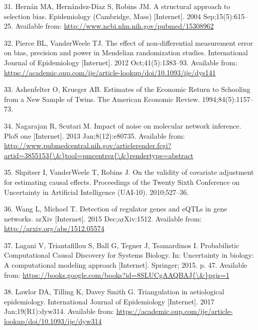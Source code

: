 \documentclass[]{article}
\begin{document}
\hypertarget{ref-Hernan2004}{}
31. Hernán MA, Hernández-Díaz S, Robins JM. A structural approach to
selection bias. Epidemiology (Cambridge, Mass) {[}Internet{]}. 2004
Sep;15(5):615--25. Available from:
\url{http://www.ncbi.nlm.nih.gov/pubmed/15308962}

\hypertarget{ref-Pierce2012}{}
32. Pierce BL, VanderWeele TJ. The effect of non-differential
measurement error on bias, precision and power in Mendelian
randomization studies. International Journal of Epidemiology
{[}Internet{]}. 2012 Oct;41(5):1383--93. Available from:
\url{https://academic.oup.com/ije/article-lookup/doi/10.1093/ije/dys141}

\hypertarget{ref-Ashenfelter1994}{}
33. Ashenfelter O, Krueger AB. Estimates of the Economic Return to
Schooling from a New Sample of Twins. The American Economic Review.
1994;84(5):1157--73.

\hypertarget{ref-Nagarajan2013}{}
34. Nagarajan R, Scutari M. Impact of noise on molecular network
inference. PloS one {[}Internet{]}. 2013 Jan;8(12):e80735. Available
from:
\href{http://www.pubmedcentral.nih.gov/articlerender.fcgi?artid=3855153\%7B/\&\%7Dtool=pmcentrez\%7B/\&\%7Drendertype=abstract}{http://www.pubmedcentral.nih.gov/articlerender.fcgi?artid=3855153\{\textbackslash{}\&\}tool=pmcentrez\{\textbackslash{}\&\}rendertype=abstract}

\hypertarget{ref-Shpitser2010}{}
35. Shpitser I, VanderWeele T, Robins J. On the validity of covariate
adjustment for estimating causal effects. Proceedings of the Twenty
Sixth Conference on Uncertainty in Artificial Intelligence (UAI-10).
2010;527--36.

\hypertarget{ref-Wang2015}{}
36. Wang L, Michoel T. Detection of regulator genes and eQTLs in gene
networks. arXiv {[}Internet{]}. 2015 Dec;arXiv:1512. Available from:
\url{http://arxiv.org/abs/1512.05574}

\hypertarget{ref-Lagani2015}{}
37. Lagani V, Triantafillou S, Ball G, Tegner J, Tsamardinos I.
Probabilistic Computational Causal Discovery for Systems Biology. In:
Uncertainty in biology: A computational modeling approach
{[}Internet{]}. Springer; 2015. p. 47. Available from:
\href{https://books.google.com/books?id=8SLUCgAAQBAJ\%7B/\&\%7Dpgis=1}{https://books.google.com/books?id=8SLUCgAAQBAJ\{\textbackslash{}\&\}pgis=1}

\hypertarget{ref-Lawlor2017}{}
38. Lawlor DA, Tilling K, Davey Smith G. Triangulation in aetiological
epidemiology. International Journal of Epidemiology {[}Internet{]}. 2017
Jan;19(R1):dyw314. Available from:
\url{https://academic.oup.com/ije/article-lookup/doi/10.1093/ije/dyw314}
\end{document}
